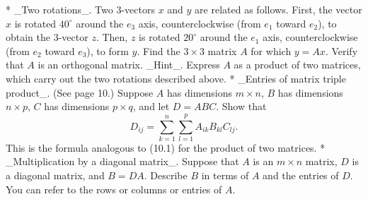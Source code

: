 * _Two rotations_. Two 3-vectors \(x\) and \(y\) are related as follows. First, the vector \(x\) is rotated \(40^{\circ}\) around the \(e_{3}\) axis, counterclockwise (from \(e_{1}\) toward \(e_{2}\)), to obtain the 3-vector \(z\). Then, \(z\) is rotated \(20^{\circ}\) around the \(e_{1}\) axis, counterclockwise (from \(e_{2}\) toward \(e_{3}\)), to form \(y\). Find the \(3\times 3\) matrix \(A\) for which \(y=Ax\). Verify that \(A\) is an orthogonal matrix. _Hint_. Express \(A\) as a product of two matrices, which carry out the two rotations described above.
* _Entries of matrix triple product_. (See page 10.) Suppose \(A\) has dimensions \(m\times n\), \(B\) has dimensions \(n\times p\), \(C\) has dimensions \(p\times q\), and let \(D=ABC\). Show that \[D_{ij}=\sum_{k=1}^{n}\sum_{l=1}^{p}A_{ik}B_{kl}C_{lj}.\] This is the formula analogous to (10.1) for the product of two matrices.
* _Multiplication by a diagonal matrix_. Suppose that \(A\) is an \(m\times n\) matrix, \(D\) is a diagonal matrix, and \(B=DA\). Describe \(B\) in terms of \(A\) and the entries of \(D\). You can refer to the rows or columns or entries of \(A\).

